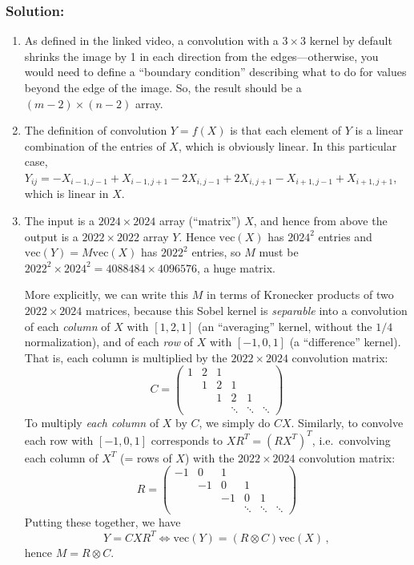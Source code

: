 \documentclass[10pt,oneside]{article}
\begin{document}
\subsubsection*{Solution:}

\begin{enumerate}

\item As defined in the linked video, a convolution with a $3 \times 3$ kernel by default shrinks the image by 1 in each direction from the edges---otherwise, you would need to define a ``boundary condition'' describing what to do for values beyond the edge of the image.  So, the result should be a $\boxed{(m-2)\times(n-2)}$ array.

\item The definition of convolution $Y = f(X)$ is that each element of $Y$ is a linear combination of the entries of $X$, which is obviously linear.  In this particular case, $Y_{ij} = -X_{i-1,j-1} + X_{i-1,j+1} - 2X_{i,j-1} + 2X_{i,j+1} -X_{i+1,j-1} + X_{i+1,j+1}$, which is linear in $X$.

\item The input is a $2024 \times 2024$ array (``matrix'') $X$, and hence from above the output is a $2022 \times 2022$ array $Y$.  Hence $\mathrm{vec}(X)$ has $2024^2$ entries and $\mathrm{vec}(Y) = M \mathrm{vec}(X)$ has $2022^2$ entries, so $M$ must be $\boxed{2022^2 \times 2024^2 = 4088484 \times 4096576}$, a huge matrix.

More explicitly, we can write this $M$ in terms of Kronecker products of two $2022 \times 2024$ matrices, because this Sobel kernel is \emph{separable} into a convolution of each \emph{column} of $X$ with $[1,2,1]$ (an ``averaging'' kernel, without the $1/4$ normalization), and of each \emph{row} of $X$ with $[-1,0,1]$ (a ``difference'' kernel).    That is, each column is multiplied by the $2022 \times 2024$ convolution matrix:
$$
C = \begin{pmatrix} 1 & 2 & 1 & & & \\
                    & 1 & 2 & 1 & & \\
                    & & 1 & 2 & 1 & \\
                    & & & \ddots & \ddots & \ddots \end{pmatrix}
$$
To multiply \emph{each column} of $X$ by $C$, we simply do $CX$.  Similarly, to convolve each row with $[-1,0,1]$ corresponds to $XR^T = (RX^T)^T$, i.e.~convolving each column of $X^T$ (= rows of $X$) with the $2022 \times 2024$ convolution matrix:
$$
R = \begin{pmatrix} -1 & 0 & 1 & & & \\
                    & -1 & 0 & 1 & & \\
                    & & -1 & 0 & 1 & \\
                    & & & \ddots & \ddots & \ddots \end{pmatrix}
$$
Putting these together, we have
$$
Y = CXR^T \Longleftrightarrow \mathrm{vec}(Y) = (R\otimes C)\mathrm{vec}(X) \, ,
$$
hence $\boxed{M = R\otimes C}$.


\end{enumerate}
\end{document}
